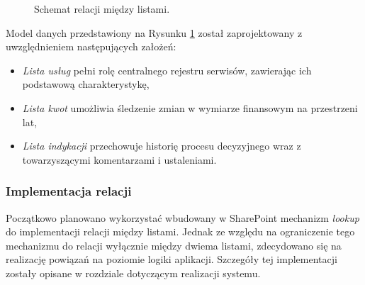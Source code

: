 \begin{figure}[h]
{}
    \caption{Schemat relacji między listami.}
    \label{SchematList}
\end{figure}

Model danych przedstawiony na Rysunku \ref{SchematList} został zaprojektowany z uwzględnieniem następujących założeń:

\begin{itemize}
    \item \emph{Lista usług} pełni rolę centralnego rejestru serwisów, zawierając ich podstawową charakterystykę,
    \item \emph{Lista kwot} umożliwia śledzenie zmian w wymiarze finansowym na przestrzeni lat,
    \item \emph{Lista indykacji} przechowuje historię procesu decyzyjnego wraz z towarzyszącymi komentarzami i ustaleniami.
\end{itemize}

\subsubsection{Implementacja relacji}
Początkowo planowano wykorzystać wbudowany w SharePoint mechanizm \emph{lookup} do implementacji relacji między listami. Jednak ze względu na ograniczenie tego mechanizmu do relacji wyłącznie między dwiema listami, zdecydowano się na realizację powiązań na poziomie logiki aplikacji. Szczegóły tej implementacji zostały opisane w rozdziale dotyczącym realizacji systemu.



